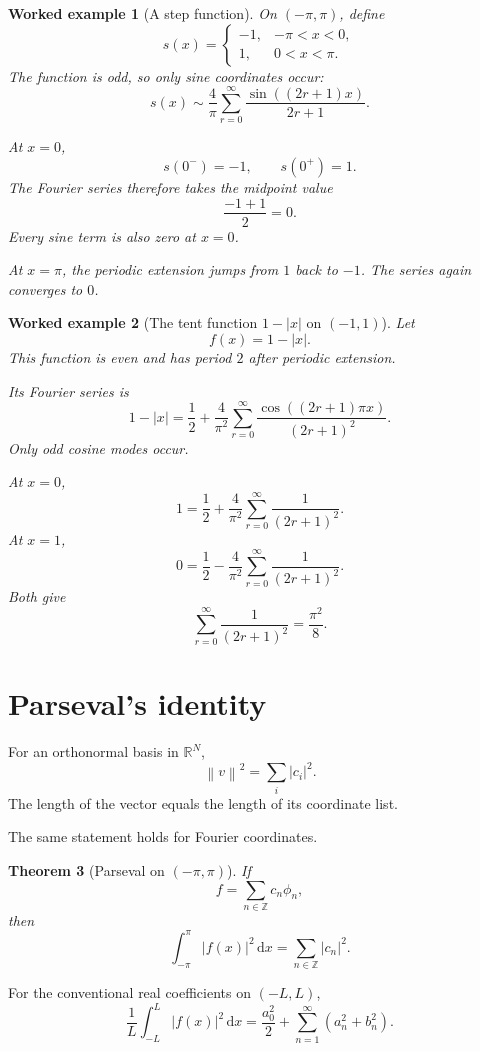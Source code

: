 \documentclass[11pt,a5paper,oneside,openany]{scrreprt}
\theoremstyle{notes}
\newtheorem{theorem}{Theorem}[section]
\theoremstyle{definitions}
\newtheorem{example}[theorem]{Worked example}
\newcommand{\R}{\mathbb{R}}
\newcommand{\Z}{\mathbb{Z}}
\newcommand{\norm}[1]{\left\lVert #1\right\rVert}
\newcommand{\dd}{\,\mathrm{d}}
\begin{document}
\begin{example}[A step function]
On $(-\pi,\pi)$, define
\[
 s(x)=
 \begin{cases}
 -1,&-\pi<x<0,\\
 1,&0<x<\pi.
 \end{cases}
\]
The function is odd, so only sine coordinates occur:
\[
 \boxed{
 s(x)\sim\frac4\pi
 \sum_{r=0}^{\infty}
 \frac{\sin((2r+1)x)}{2r+1}.}
\]

At $x=0$,
\[
 s(0^- )=-1,
 \qquad
 s(0^+)=1.
\]
The Fourier series therefore takes the midpoint value
\[
 \frac{-1+1}{2}=0.
\]
Every sine term is also zero at $x=0$.

At $x=\pi$, the periodic extension jumps from $1$ back to $-1$.
The series again converges to $0$.
\end{example}

\begin{example}[The tent function $1-|x|$ on $(-1,1)$]
Let
\[
 f(x)=1-|x|.
\]
This function is even and has period $2$ after periodic extension.

Its Fourier series is
\[
 \boxed{
 1-|x|
 =\frac12+\frac4{\pi^2}
 \sum_{r=0}^{\infty}
 \frac{\cos((2r+1)\pi x)}{(2r+1)^2}.}
\]
Only odd cosine modes occur.

At $x=0$,
\[
 1=\frac12+\frac4{\pi^2}
 \sum_{r=0}^{\infty}\frac1{(2r+1)^2}.
\]
At $x=1$,
\[
 0=\frac12-\frac4{\pi^2}
 \sum_{r=0}^{\infty}\frac1{(2r+1)^2}.
\]
Both give
\[
 \sum_{r=0}^{\infty}\frac1{(2r+1)^2}
 =\frac{\pi^2}{8}.
\]
\end{example}

\section{Parseval's identity}

For an orthonormal basis in $\R^N$,
\[
 \norm{v}^2=\sum_i|c_i|^2.
\]
The length of the vector equals the length of its coordinate list.

The same statement holds for Fourier coordinates.

\begin{theorem}[Parseval on $(-\pi,\pi)$]
If
\[
 f=\sum_{n\in\Z}c_n\phi_n,
\]
then
\[
 \boxed{
 \int_{-\pi}^{\pi}|f(x)|^2\dd x
 =\sum_{n\in\Z}|c_n|^2.}
\]
\end{theorem}

For the conventional real coefficients on $(-L,L)$,
\[
 \boxed{
 \frac1L\int_{-L}^{L}|f(x)|^2\dd x
 =\frac{a_0^2}{2}
 +\sum_{n=1}^{\infty}(a_n^2+b_n^2).}
\]
\end{document}
